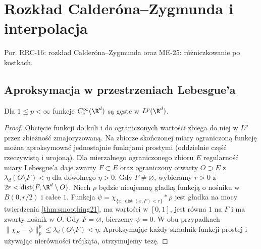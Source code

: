 \setcounter{section}{18}
\section{Rozkład Calderóna--Zygmunda i interpolacja}
\label{sec:dt-calderon-zygmund}
\providecommand{\atlasref}[2]{#2}
Por. \atlasref{PDE-16::lem:pde16-cz-decomp}{RRC-16: rozkład Calderóna--Zygmunda}
oraz \atlasref{ME-25::cor:cubes-differentiation-25}{ME-25: różniczkowanie po kostkach}.
\subsection{Aproksymacja w przestrzeniach Lebesgue'a}

\begin{twierdzenie}
\label{thm:dt-test-density}
Dla $1\le p<\infty$ funkcje $C_c^\infty(\R^d)$
są gęste w $L^p(\R^d)$.
\end{twierdzenie}
\begin{proof}
Obcięcie funkcji do kuli i do ograniczonych wartości
zbiega do niej w $L^p$ przez zbieżność zmajoryzowaną.
Na zbiorze skończonej miary ograniczoną funkcję
można aproksymować jednostajnie funkcjami prostymi
(oddzielnie część rzeczywistą i urojoną).
Dla mierzalnego ograniczonego zbioru $E$ regularność
miary Lebesgue'a daje zwarty $F\subset E$ oraz
ograniczony otwarty $O\supset E$ z
$\lambda_d(O\setminus F)<\eta$ dla dowolnego $\eta>0$.
Gdy $F\ne\varnothing$, wybieramy $r>0$ z
$2r<\operatorname{dist}(F,\R^d\setminus O)$.
Niech $\rho$ będzie nieujemną gładką funkcją o nośniku
w $B(0,r/2)$ i całce $1$. Funkcja
$\psi=\chi_{\{x:\operatorname{dist}(x,F)<r\}}*\rho$
jest gładka na mocy twierdzenia \ref{thm:smoothing21},
ma wartości w $[0,1]$, jest równa $1$ na $F$
i ma zwarty nośnik w $O$. Gdy $F=\varnothing$,
bierzemy $\psi=0$. W obu przypadkach
$\|\chi_E-\psi\|_p^p\le\lambda_d(O\setminus F)<\eta$.
Aproksymując każdy składnik funkcji prostej i używając
nierówności trójkąta, otrzymujemy tezę.
\end{proof}

